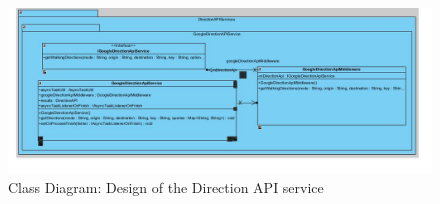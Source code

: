    \begin{figure}[htbp!]
        \centering \includegraphics[scale=0.6]{grafiken/directionService.jpg}
        \caption{Class Diagram: Design of the Direction API service}
        \label{fig:directionServiceClassDiagram}
    \end{figure}